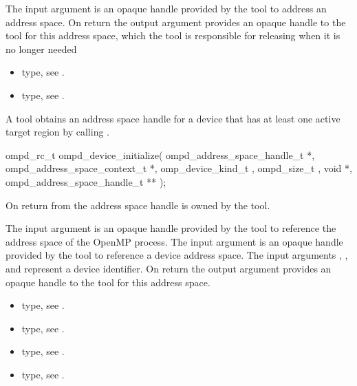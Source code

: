 \argdesc
The input argument  is an opaque handle provided by the tool
to address an address space.
On return the output argument  provides an opaque handle to the
tool for this address space, which the tool is responsible for 
releasing when it is no longer needed

\crossreferences
\begin{itemize}
	\item {} type, see 
	.
	\item {} type, see 
	.
\end{itemize}


\label{subsubsubsec:ompd_device_initialize}
\summary
A tool obtains an address space handle for a device that has
at least one active target region by calling
.

\format

\begin{cspecific}
\begin{ompSyntax}
ompd_rc_t ompd_device_initialize(
  ompd_address_space_handle_t *,
  ompd_address_space_context_t *,
  omp_device_kind_t ,
  ompd_size_t ,
  void *,
  ompd_address_space_handle_t **
);
\end{ompSyntax}
\end{cspecific}


\descr
On return from  the address
space handle is owned by the tool.

\argdesc

The input argument  is an opaque handle provided by the tool
to reference the address space of the OpenMP process.
The input argument  is an opaque handle provided by the tool
to reference a device address space.
The input arguments ,  , and  represent a device identifier. 
On return the output argument  provides an opaque handle to the
tool for this address space.

\crossreferences
\begin{itemize}
	\item {} type, see 
	.
	\item {} type, see .
	\item {} type, see .
	\item {} type, see 
	.
\end{itemize}



